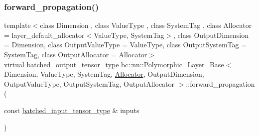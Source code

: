 \subsubsection{\texorpdfstring{forward\+\_\+propagation()}{forward\_propagation()}\hspace{0.1cm}{\footnotesize\ttfamily [1/2]}}
{\footnotesize\ttfamily template$<$class Dimension , class Value\+Type , class System\+Tag , class Allocator  = layer\+\_\+default\+\_\+allocator$<$\+Value\+Type, System\+Tag$>$, class Output\+Dimension  = Dimension, class Output\+Value\+Type  = Value\+Type, class Output\+System\+Tag  = System\+Tag, class Output\+Allocator  = Allocator$>$ \\
virtual \hyperlink{structbc_1_1nn_1_1Polymorphic__Layer__Base_a45ed57549be9c4e5c40c52168ca15ae9}{batched\+\_\+output\+\_\+tensor\+\_\+type} \hyperlink{structbc_1_1nn_1_1Polymorphic__Layer__Base}{bc\+::nn\+::\+Polymorphic\+\_\+\+Layer\+\_\+\+Base}$<$ Dimension, Value\+Type, System\+Tag, \hyperlink{classbc_1_1allocators_1_1Allocator}{Allocator}, Output\+Dimension, Output\+Value\+Type, Output\+System\+Tag, Output\+Allocator $>$\+::forward\+\_\+propagation (\begin{DoxyParamCaption}\item[{const \hyperlink{structbc_1_1nn_1_1Polymorphic__Layer__Base_ae694b03dd73923ff973b0d2c9156e161}{batched\+\_\+input\+\_\+tensor\+\_\+type} \&}]{inputs }\end{DoxyParamCaption})\hspace{0.3cm}{\ttfamily [pure virtual]}}

\mbox{\label{structbc_1_1nn_1_1Polymorphic__Layer__Base_a0dc71591b6ca387501c2cace61be3e78}} 
